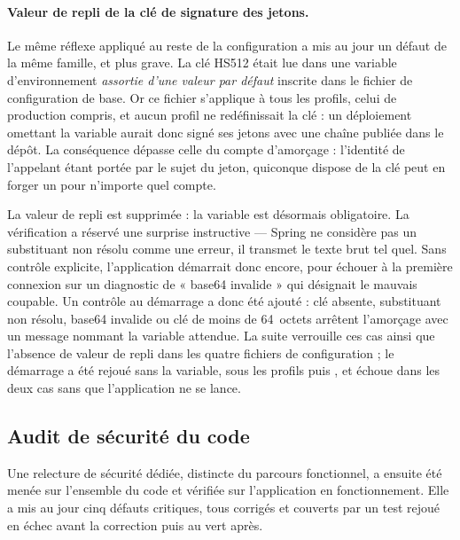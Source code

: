 \paragraph{Valeur de repli de la clé de signature des jetons.} Le même réflexe appliqué
au reste de la configuration a mis au jour un défaut de la même famille, et plus grave.
La clé HS512 était lue dans une variable d'environnement \emph{assortie d'une valeur par
défaut} inscrite dans le fichier de configuration de base. Or ce fichier s'applique à
tous les profils, celui de production compris, et aucun profil ne redéfinissait la clé :
un déploiement omettant la variable aurait donc signé ses jetons avec une chaîne publiée
dans le dépôt. La conséquence dépasse celle du compte d'amorçage : l'identité de
l'appelant étant portée par le sujet du jeton, quiconque dispose de la clé peut en forger
un pour n'importe quel compte.

La valeur de repli est supprimée : la variable est désormais obligatoire. La vérification
a réservé une surprise instructive --- Spring ne considère pas un substituant non résolu
comme une erreur, il transmet le texte brut  tel quel. Sans
contrôle explicite, l'application démarrait donc encore, pour échouer à la première
connexion sur un diagnostic de « base64 invalide » qui désignait le mauvais coupable.
Un contrôle au démarrage a donc été ajouté : clé absente, substituant non résolu, base64
invalide ou clé de moins de 64~octets arrêtent l'amorçage avec un message nommant la
variable attendue. La suite  verrouille ces cas ainsi que
l'absence de valeur de repli dans les quatre fichiers de configuration ; le démarrage a
été rejoué sans la variable, sous les profils  puis , et échoue dans
les deux cas sans que l'application ne se lance.

\subsection{Audit de sécurité du code}
\label{sec:auditsec}

Une relecture de sécurité dédiée, distincte du parcours fonctionnel, a ensuite été menée
sur l'ensemble du code et vérifiée sur l'application en fonctionnement. Elle a mis au jour
cinq défauts critiques, tous corrigés et couverts par un test rejoué en échec avant la
correction puis au vert après.

